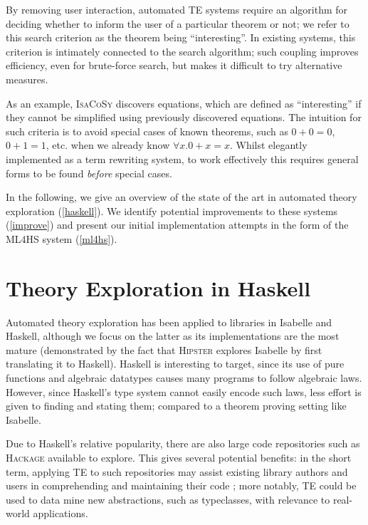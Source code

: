 \documentclass{llncs}
\begin{document}
By removing user interaction, automated TE systems require an algorithm
for deciding whether to inform the user of a particular theorem or not; we refer
to this search criterion as the theorem being ``interesting''. In existing
systems, this criterion is intimately connected to the
search algorithm; such coupling improves efficiency, even for brute-force
search, but makes it difficult to try alternative measures.

As an example, \textsc{IsaCoSy} \cite{johansson2009isacosy} discovers
equations, which are defined as ``interesting'' if they cannot be simplified
using previously discovered equations. The intuition for such criteria is to
avoid special cases of known theorems, such as $0 + 0 = 0$, $0 + 1 = 1$,
etc. when we already know $\forall x. 0 + x = x$. Whilst elegantly implemented
as a term rewriting system, to work effectively this requires general forms to
be found \emph{before} special cases.

In the following, we give an overview of the state of the art in automated
theory exploration (\autoref{haskell}). We identify potential improvements to
these systems (\autoref{improve}) and present our initial implementation
attempts in the form of the \textsc{ML4HS} system (\autoref{ml4hs}).

\section{Theory Exploration in Haskell}\label{haskell}

Automated theory exploration has been applied to libraries in Isabelle
and Haskell, although we focus on the latter as its implementations are
the most mature (demonstrated by the fact that \textsc{Hipster} explores
Isabelle by first translating it to Haskell). Haskell is interesting to target,
since its use of pure functions and algebraic datatypes causes many programs to
follow algebraic laws. However, since Haskell's type system cannot easily
encode such laws, less effort is given to finding and stating them; compared to
a theorem proving setting like Isabelle.

Due to Haskell's relative popularity, there are also large code repositories
such as \textsc{Hackage} available to explore. This gives several potential
benefits: in the short term, applying TE to such repositories may assist
existing library authors and users in comprehending and maintaining their code
\cite{QuickSpec}; more notably, TE could be used to data mine new abstractions,
such as typeclasses, with relevance to real-world applications.
\end{document}
